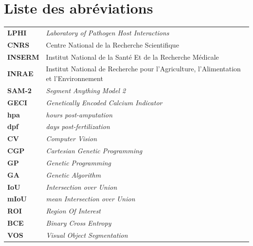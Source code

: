 \documentclass[a4paper,12pt]{report}
\begin{document}
\section*{Liste des abréviations}
\begin{longtable}{lL{0.8\textwidth}}
    \textbf{LPHI}   & \textit{Laboratory of Pathogen Host Interactions}                                    \\
    \textbf{CNRS}   & Centre National de la Recherche Scientifique                                         \\
    \textbf{INSERM} & Institut National de la Santé Et de la Recherche Médicale                            \\
    \textbf{INRAE}  & Institut National de Recherche pour l'Agriculture, l'Alimentation et l'Environnement \\
    \textbf{SAM-2}  & \textit{Segment Anything Model 2}                                                    \\
    \textbf{GECI}   & \textit{Genetically Encoded Calcium Indicator}                                       \\
    \textbf{hpa}    & \textit{hours post-amputation}                                                       \\
    \textbf{dpf}    & \textit{days post-fertilization}                                                     \\
    \textbf{CV}     & \textit{Computer Vision}                                                             \\
    \textbf{CGP}    & \textit{Cartesian Genetic Programming}                                               \\
    \textbf{GP}     & \textit{Genetic Programming}                                                         \\
    \textbf{GA}     & \textit{Genetic Algorithm}                                                           \\
    \textbf{IoU}    & \textit{Intersection over Union}                                                     \\
    \textbf{mIoU}   & \textit{mean Intersection over Union}                                                \\
    \textbf{ROI}    & \textit{Region Of Interest}                                                          \\
    \textbf{BCE}    & \textit{Binary Cross Entropy}                                                        \\
    \textbf{VOS}    & \textit{Visual Object Segmentation}                                                  \\
\end{longtable}
\end{document}
